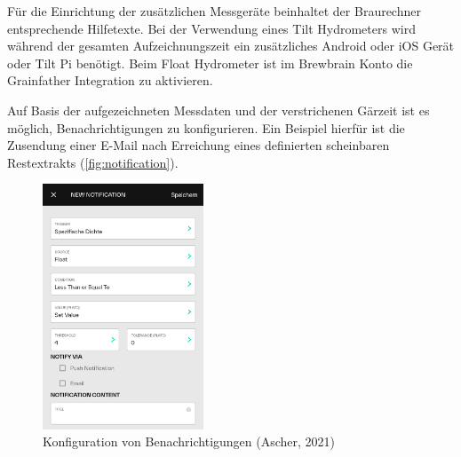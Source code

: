 \documentclass[a4paper,parskip=half]{scrartcl}
\begin{document}
Für die Einrichtung der zusätzlichen Messgeräte beinhaltet
der Braurechner entsprechende Hilfetexte. Bei der
Verwendung eines Tilt Hydrometers wird während der gesamten
Aufzeichnungszeit ein zusätzliches Android oder iOS Gerät oder
Tilt Pi benötigt. Beim Float Hydrometer ist im Brewbrain Konto
die Grainfather Integration zu aktivieren.

Auf Basis der aufgezeichneten Messdaten und der verstrichenen
Gärzeit ist es möglich, Benachrichtigungen zu konfigurieren.
Ein Beispiel hierfür ist die Zusendung einer E-Mail nach
Erreichung eines definierten scheinbaren Restextrakts
(\autoref{fig:notification}).

\begin{figure}[H]
\centering
\includegraphics[width=4.8cm]{images/gfpc_notification.png}
\caption{Konfiguration von Benachrichtigungen (Ascher, 2021)}
\label{fig:notification}
\end{figure}
\end{document}
